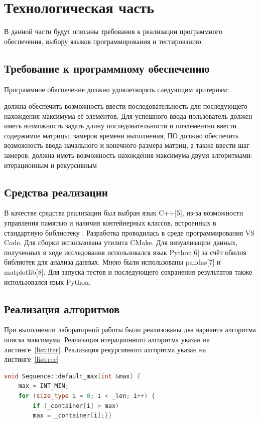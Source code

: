 \chapter{Технологическая часть}
В данной части будут описаны требования к реализации программного обеспечения, выбору языков программирования и тестированию.


\section{Требование к программному обеспечению}
Программное обеспечение должно удовлетворять следующим критериям:
\begin{itemize}
	 должна обеспечить возможность ввести последовательность для последующего нахождения максимума её элементов. Для успешного ввода пользователь должен иметь возможность задать длину последовательности и  поэлементно ввести содержимое матрицы;
	 замеров времени выполнения, ПО должно обеспечить возможность ввода начального и конечного размера матриц, а также ввести шаг замеров;
	 должна иметь возможность нахождения максимума двумя алгоритмами: итерационным и рекурсивным
\end{itemize}

\section{Средства реализации}
В качестве средства реализации был выбран язык C++[5], из-за возможности управления памятью и наличия контейнерных классов, встроенных в стандартную библиотеку . Разработка проводилась в среде программирования VS Code. Для сборки использована утилита CMake. Для визуализации данных, полученных в ходе исследования использовался язык Python[6] за счёт обилия библиотек для анализа данных. Мною были использованы pandas[7] и matplotlib[8]. Для запуска тестов и последующего сохранения результатов также использовался язык Python.

\section{Реализация алгоритмов}
При выполнении лабораторной работы были реализованы два варианта алгоритма поиска максимума. Реализация итерационного алгоритма указан на листинге \ref{list:iter}. Реализация рекурсивного алгоритма указан на листинге \ref{list:rec}
\\
\begin{lstlisting}[language=C++, caption={Итерационный алгоритм поиска максимума}, captionpos=b, label=list:iter]
void Sequence::default_max(int &max) {
	max = INT_MIN;
	for (size_type i = 0; i < _len; i++) {
		if (_container[i] > max)
		max = _container[i];}}
\end{lstlisting}

